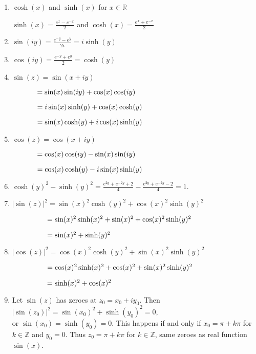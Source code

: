 \documentclass[12pt]{article}
\begin{document}
\begin{enumerate}
    \item $\cosh{(x)}$ and $\sinh{(x)}$ for $x\in\mathbb{R}$
    
    $\sinh{(x)} = \frac{e^x -e^{-x}}{2}$ and $\cosh{(x)} = \frac{e^x+e^{-x}}{2}$

    \item $\sin{(iy)} = \frac{e^{-y} - e^{y}}{2i} = i \sinh{(y)}$
    \item $\cos{(iy)} = \frac{e^{-y} + e^y}{2} = \cosh{(y)}$
    \item $\sin(z) = \sin(x+iy) $
        
        $\hspace{1.2cm}= \sin(x)\sin(iy) + \cos(x)\cos(iy)$
        
       $\hspace{1.2cm}= i\sin(x)\sinh(y) + \cos(x)\cosh(y)$
        
        $\hspace{1.2cm}= \sin(x)\cosh(y) + i\cos(x)\sinh(y)$
    \item $\cos(z) = \cos(x+iy)$

    $ \hspace{1.2cm}= \cos(x)\cos(iy) - \sin(x)\sin(iy)$

    $\hspace{1.2cm} = \cos(x)\cosh(y) - i\sin(x)\sinh(y)$

    \item $\cosh(y)^2 - \sinh(y)^2 = \frac{e^{2y} + e^{-2y} +2}{4} - \frac{e^{2y} + e^{-2y} - 2}{4} = 1$.
    \item $|\sin(z)|^2 = \sin(x)^2\cosh(y)^2 + \cos(x)^2\sinh(y)^2$

    $\hspace{1.7cm}= \sin(x)^2\sinh(x)^2 + \sin(x)^2 + \cos(x)^2\sinh(y)^2$

    $\hspace{1.7cm}=\sin(x)^2 +  \sinh(y)^2$

    \item $|\cos(z)|^2 = \cos(x)^2\cosh(y)^2 + \sin(x)^2\sinh(y)^2$

    $\hspace{1.7cm}= \cos(x)^2\sinh(x)^2 + \cos(x)^2 + \sin(x)^2\sinh(y)^2$

    $\hspace{1.7cm}= \sinh(x)^2 + \cos(x)^2$

    \item Let $\sin(z)$ has zeroes at $z_0 = x_0 + iy_0$. Then $|\sin(z_0)|^2 = \sin(x_0)^2 + \sinh(y_0)^2 = 0$, \\or $\sin(x_0) = \sinh(y_0) = 0$. This happens if and only if $x_0 = \pi + k\pi$ for $k \in \mathbb{Z}$ and $y_0 = 0$. Thus $z_0 = \pi + k\pi$ for $k \in \mathbb{Z}$, same zeroes as real function $\sin(x)$.


\end{enumerate}
\end{document}
